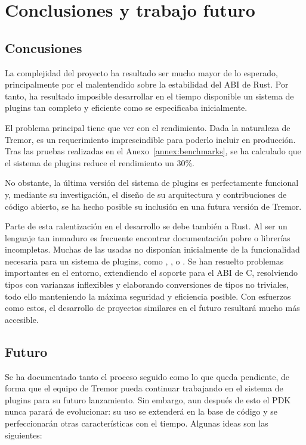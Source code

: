 
\chapter{Conclusiones y trabajo futuro}

\section{Concusiones}

La complejidad del proyecto ha resultado ser mucho mayor de lo esperado,
principalmente por el malentendido sobre la estabilidad del ABI de Rust. Por
tanto, ha resultado imposible desarrollar en el tiempo disponible un sistema de
plugins tan completo y eficiente como se especificaba inicialmente.

El problema principal tiene que ver con el rendimiento. Dada la naturaleza de
Tremor, es un requerimiento imprescindible para poderlo incluir en producción.
Tras las pruebas realizadas en el Anexo~\ref{annex:benchmarks}, se ha calculado
que el sistema de plugins reduce el rendimiento un 30\%.

No obstante, la última versión del sistema de plugins es perfectamente funcional
y, mediante su investigación, el diseño de su arquitectura y contribuciones de
código abierto, se ha hecho posible su inclusión en una futura versión de
Tremor.

Parte de esta ralentización en el desarrollo se debe también a Rust. Al ser un
lenguaje tan inmaduro es frecuente encontrar documentación pobre o librerías
incompletas. Muchas de las \crates usadas no disponían inicialmente de la
funcionalidad necesaria para un sistema de plugins, como ,
,  o . Se han resuelto
problemas importantes en el entorno, extendiendo el soporte para el ABI de C,
resolviendo tipos con varianzas inflexibles y elaborando conversiones de tipos
no triviales, todo ello manteniendo la máxima seguridad y eficiencia posible.
Con esfuerzos como estos, el desarrollo de proyectos similares en el futuro
resultará mucho más accesible.

\section{Futuro}

Se ha documentado tanto el proceso seguido como lo que queda pendiente, de forma
que el equipo de Tremor pueda continuar trabajando en el sistema de plugins para
su futuro lanzamiento. Sin embargo, aun después de esto el PDK nunca parará de
evolucionar: su uso se extenderá en la base de código y se perfeccionarán otras
características con el tiempo. Algunas ideas son las siguientes:

